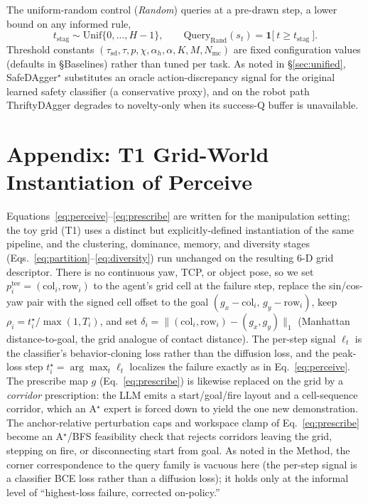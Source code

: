 \documentclass[letterpaper]{article} %
\begin{document}
The uniform-random control (\emph{Random}) queries at a pre-drawn step, a lower
bound on any informed rule,
\begin{equation}
t_{\mathrm{stag}}\sim\mathrm{Unif}\{0,\dots,H-1\},
\qquad
\mathrm{Query}_{\mathrm{Rand}}(s_t)=\mathbf{1}\big[\ t\ge t_{\mathrm{stag}}\ \big].
\label{eq:stagger}
\end{equation}
Threshold constants $(\tau_{\mathrm{sd}},\tau,p,\chi,\alpha_h,\alpha,K,M,N_{\mathrm{mc}})$
are fixed configuration values (defaults in \S Baselines) rather than tuned per task.
As noted in \S\ref{sec:unified}, SafeDAgger$^\star$ substitutes an oracle
action-discrepancy signal for the original learned safety classifier (a conservative
proxy), and on the robot path ThriftyDAgger degrades to novelty-only when its
success-Q buffer is unavailable.

\section*{Appendix: T1 Grid-World Instantiation of Perceive}
\label{app:t1grid}

Equations~\ref{eq:perceive}--\ref{eq:prescribe} are written for the manipulation
setting; the toy grid (T1) uses a distinct but explicitly-defined instantiation of
the same pipeline, and the clustering, dominance, memory, and diversity stages
(Eqs.~\ref{eq:partition}--\ref{eq:diversity}) run unchanged on the resulting $6$-D
grid descriptor. There is no continuous yaw, TCP, or object pose, so we set
$p^{\mathrm{tee}}_i=(\mathrm{col}_i,\mathrm{row}_i)$ to the agent's grid cell at the
failure step, replace the sin/cos-yaw pair with the signed cell offset to the goal
$(g_x-\mathrm{col}_i,\,g_y-\mathrm{row}_i)$, keep $\rho_i=t^\star_i/\max(1,T_i)$, and
set $\delta_i=\|(\mathrm{col}_i,\mathrm{row}_i)-(g_x,g_y)\|_1$ (Manhattan
distance-to-goal, the grid analogue of contact distance). The per-step signal
$\ell_t$ is the classifier's behavior-cloning loss rather than the diffusion loss,
and the peak-loss step $t^\star_i=\arg\max_t\ell_t$ localizes the failure exactly as
in Eq.~\ref{eq:perceive}. The prescribe map $g$ (Eq.~\ref{eq:prescribe}) is
likewise replaced on the grid by a \emph{corridor} prescription: the LLM emits a
start/goal/fire layout and a cell-sequence corridor, which an A$^\star$ expert is
forced down to yield the one new demonstration. The anchor-relative perturbation
caps and workspace clamp of Eq.~\ref{eq:prescribe} become an A$^\star$/BFS
feasibility check that rejects corridors leaving the grid, stepping on fire, or
disconnecting start from goal. As noted in the Method, the corner correspondence to
the query family is vacuous here (the per-step signal is a classifier BCE loss
rather than a diffusion loss); it holds only at the informal level of
``highest-loss failure, corrected on-policy.''



\end{document}
